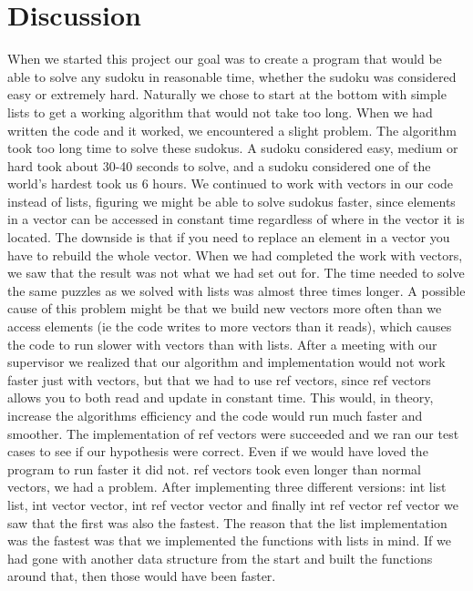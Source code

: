 \documentclass[12pt, a4paper]{report}
\begin{document}
\section{Discussion}
When we started this project our goal was to create a program that would be able to solve any sudoku in reasonable time, whether the sudoku was considered easy or extremely hard. Naturally we chose to start at the bottom with simple lists to get a working algorithm that would not take too long. When we had written the code and it worked, we encountered a slight problem. The algorithm took too long time to solve these sudokus. A sudoku considered easy, medium or hard took about 30-40 seconds to solve, and a sudoku considered one of the world’s hardest took us 6 hours. 
	We continued to work with vectors in our code instead of lists, figuring we might be able to  solve sudokus faster, since elements in a vector can be accessed in constant time regardless of where in the vector it is located. The downside is that if you need to replace an element in a vector you have to rebuild the whole vector.
	When we had completed the work with vectors, we saw that the result was not what we had set out for. The time needed to solve the same puzzles as we solved with lists was almost three times longer. A possible cause of this problem might be that we build new vectors more often than we access elements (ie the code writes to more vectors than it reads), which causes the code to run slower with vectors than with lists.
	After a meeting with our supervisor we realized that our algorithm and implementation would not work faster just with vectors, but that we had to use ref vectors, since ref vectors allows you to both read and update in constant time. This would, in theory, increase the algorithms efficiency and the code would run much faster and smoother.
	The implementation of ref vectors were succeeded and we ran our test cases to see if our hypothesis were correct. Even if we would have loved the program to run faster it did not. ref vectors took even longer than normal vectors, we had a problem. After implementing three different versions: int list list, int vector vector, int ref vector vector and finally int ref vector ref vector we saw that the first was also the fastest. The reason that the list implementation was the fastest was that we implemented the functions with lists in mind. If we had gone with another data structure from the start and built the functions around that, then those would have been faster.
\end{document}
